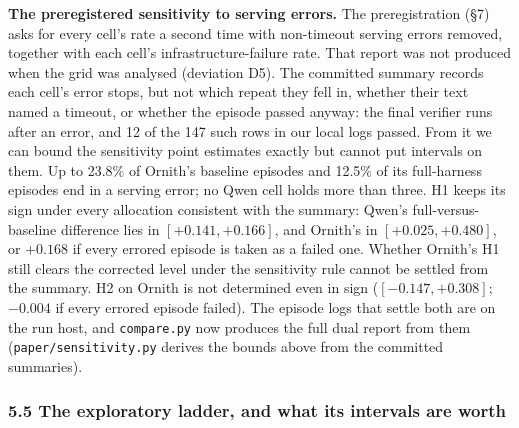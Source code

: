 \documentclass[
  10pt,
  a4paper,
]{article}
\let\oldtexttt\texttt
\renewcommand{\texttt}[1]{{\small\oldtexttt{#1}}}
\begin{document}
\textbf{The preregistered sensitivity to serving errors.} The
preregistration (§7) asks for every cell's rate a second time with
non-timeout serving errors removed, together with each cell's
infrastructure-failure rate. That report was not produced when the grid
was analysed (deviation D5). The committed summary records each cell's
error stops, but not which repeat they fell in, whether their text named
a timeout, or whether the episode passed anyway: the final verifier runs
after an error, and 12 of the 147 such rows in our local logs passed.
From it we can bound the sensitivity point estimates exactly but cannot
put intervals on them. Up to 23.8\% of Ornith's baseline episodes and
12.5\% of its full-harness episodes end in a serving error; no Qwen cell
holds more than three. H1 keeps its sign under every allocation
consistent with the summary: Qwen's full-versus-baseline difference lies
in \([+0.141, +0.166]\), and Ornith's in \([+0.025, +0.480]\), or
\(+0.168\) if every errored episode is taken as a failed one. Whether
Ornith's H1 still clears the corrected level under the sensitivity rule
cannot be settled from the summary. H2 on Ornith is not determined even
in sign (\([-0.147, +0.308]\); \(-0.004\) if every errored episode
failed). The episode logs that settle both are on the run host, and
\texttt{compare.py} now produces the full dual report from them
(\texttt{paper/sensitivity.py} derives the bounds above from the
committed summaries).

\subsubsection{5.5 The exploratory ladder, and what its intervals are
worth}\label{the-exploratory-ladder-and-what-its-intervals-are-worth}
\end{document}

